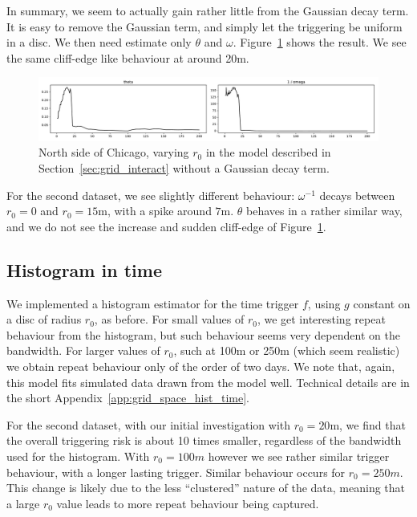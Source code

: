 \documentclass[twoside,a4paper]{article}
\theoremstyle{plain}
\theoremstyle{definition}
\begin{document}
In summary, we seem to actually gain rather little from the Gaussian decay term.  It is easy
to remove the Gaussian term, and simply let the triggering be uniform in a disc.  We then need
estimate only $\theta$ and $\omega$.  Figure~\ref{fig:grid_vary_r01} shows the result.  We see
the same cliff-edge like behaviour at around 20m.

\begin{figure}
  \includegraphics[width=\textwidth]{../notebooks/varying_r0_no_g.pdf}
  \caption{North side of Chicago, varying $r_0$ in the model described in Section~\ref{sec:grid_interact} without a Gaussian decay term.}
  \label{fig:grid_vary_r01}
\end{figure}

For the second dataset, we see slightly different behaviour: $\omega^{-1}$ decays between
$r_0=0$ and $r_0=15$m, with a spike around $7$m.  $\theta$ behaves in a rather similar way,
and we do not see the increase and sudden cliff-edge of Figure~\ref{fig:grid_vary_r01}.



\subsection{Histogram in time}

We implemented a histogram estimator for the time trigger $f$, using $g$ constant on a disc
of radius $r_0$, as before.  For small values of $r_0$, we get interesting repeat behaviour
from the histogram, but such behaviour seems very dependent on the bandwidth.  For larger
values of $r_0$, such at 100m or 250m (which seem realistic) we obtain repeat behaviour only
of the order of two days.  We note that, again, this model fits simulated data drawn from
the model well.  Technical details are in the short Appendix~\ref{app:grid_space_hist_time}.

For the second dataset, with our initial investigation with $r_0=20$m, we find that the overall
triggering risk is about 10 times smaller, regardless of the bandwidth used for the
histogram.  With $r_0=100m$ however we see rather similar trigger behaviour, with a longer
lasting trigger.  Similar behaviour occurs for $r_0=250m$.  This change is likely due to
the less ``clustered'' nature of the data, meaning that a large $r_0$ value leads to more
repeat behaviour being captured.
\end{document}
